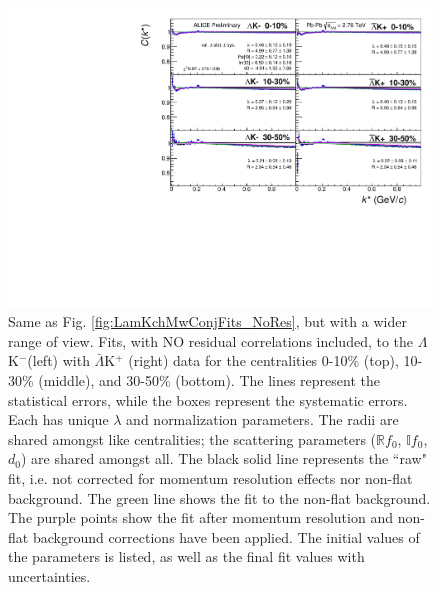 \documentclass[../AnalysisNoteJBuxton.tex]{subfiles}
\begin{document}
\begin{figure}[h]
  \centering
  \includegraphics[width=\textwidth]{7_ResultsAndDiscussion/Figures/canKStarCfwFitsLamKchMwConj_0010_1030_3050UnZoomed_MomResCrctn_NonFlatBgdCrctn_NoRes.pdf}
  \caption[$\Lambda$K$^{-}$($\bar{\Lambda}$K$^{+}$) Fits with No Residuals (Wide Range)]{Same as Fig. \ref{fig:LamKchMwConjFits_NoRes}, but with a wider range of view.
Fits, with NO residual correlations included, to the $\Lambda$K$^{-}$(left) with $\bar{\Lambda}$K$^{+}$ (right) data for the centralities 0-10\% (top), 10-30\% (middle), and 30-50\% (bottom).
The lines represent the statistical errors, while the boxes represent the systematic errors.  
Each has unique $\lambda$ and normalization parameters.
The radii are shared amongst like centralities; the scattering parameters ($\mathbb{R}f_{0}$, $\mathbb{I}f_{0}$, $d_{0}$) are shared amongst all.
The black solid line represents the ``raw" fit, i.e. not corrected for momentum resolution effects nor non-flat background.  
The green line shows the fit to the non-flat background.
The purple points show the fit after momentum resolution and non-flat background corrections have been applied.
The initial values of the parameters is listed, as well as the final fit values with uncertainties.}
  \label{fig:LamKchMwConjFitsUnZoomed_NoRes}
\end{figure}
\end{document}

